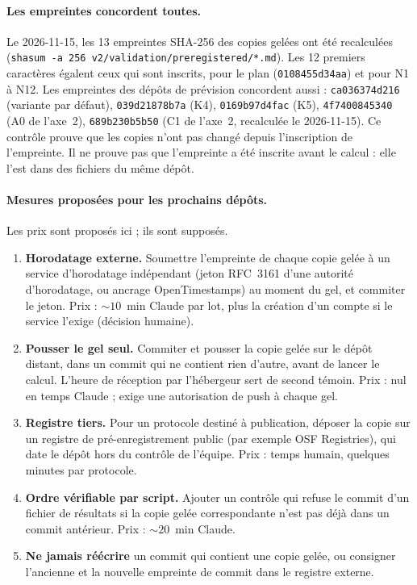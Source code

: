 \paragraph{Les empreintes concordent toutes.} Le 2026-11-15, les 13\mesure{} empreintes SHA-256
des copies gelées ont été recalculées (\texttt{shasum -a 256 v2/validation/preregistered/*.md}).
Les 12\suppose{} premiers caractères égalent ceux qui sont inscrits, pour le plan
(\texttt{0108455d34aa}) et pour N1 à N12. Les empreintes des dépôts de prévision concordent aussi :
\texttt{ca036374d216} (variante par défaut), \texttt{039d21878b7a} (K4), \texttt{0169b97d4fac} (K5),
\texttt{4f7400845340} (A0 de l'axe~2), \texttt{689b230b5b50} (C1 de l'axe~2, recalculée le
2026-11-15). Ce contrôle prouve que les copies n'ont pas changé depuis
l'inscription de l'empreinte. Il ne prouve pas que l'empreinte a été inscrite avant le calcul :
elle l'est dans des fichiers du même dépôt.

\paragraph{Mesures proposées pour les prochains dépôts.} Les prix sont proposés ici ; ils sont
supposés\suppose.
\begin{enumerate}
  \item \textbf{Horodatage externe.} Soumettre l'empreinte de chaque copie gelée à un service
        d'horodatage indépendant (jeton RFC~3161 d'une autorité d'horodatage, ou ancrage
        OpenTimestamps) au moment du gel, et commiter le jeton. Prix : $\sim 10$\suppose{}~min
        Claude par lot, plus la création d'un compte si le service l'exige (décision humaine).
  \item \textbf{Pousser le gel seul.} Commiter et pousser la copie gelée sur le dépôt distant,
        dans un commit qui ne contient rien d'autre, avant de lancer le calcul. L'heure de
        réception par l'hébergeur sert de second témoin. Prix : nul en temps Claude ; exige une
        autorisation de push à chaque gel.
  \item \textbf{Registre tiers.} Pour un protocole destiné à publication, déposer la copie sur un
        registre de pré-enregistrement public (par exemple OSF Registries), qui date le dépôt
        hors du contrôle de l'équipe. Prix : temps humain, quelques minutes par protocole.
  \item \textbf{Ordre vérifiable par script.} Ajouter un contrôle qui refuse le commit d'un
        fichier de résultats si la copie gelée correspondante n'est pas déjà dans un commit
        antérieur. Prix : $\sim 20$\suppose{}~min Claude.
  \item \textbf{Ne jamais réécrire} un commit qui contient une copie gelée, ou consigner
        l'ancienne et la nouvelle empreinte de commit dans le registre externe.
\end{enumerate}

